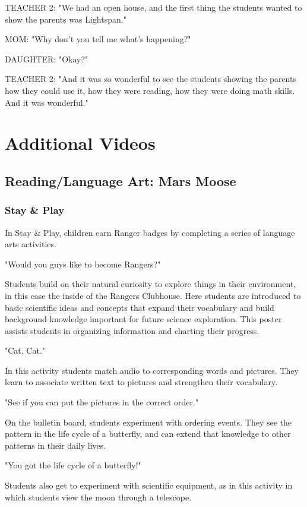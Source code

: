 TEACHER 2: "We had an open house, and the first thing the students wanted to show the parents was Lightspan."

MOM: "Why don't you tell me what's happening?"

DAUGHTER: "Okay?"

TEACHER 2: "And it was so wonderful to see the students showing the parents how they could use it, how they were reading, how they were doing math skills.
And it was wonderful."

\section{Additional Videos}

\subsection{Reading/Language Art: Mars Moose}

\subsubsection{Stay \& Play}

In Stay \& Play, children earn Ranger badges by completing a series of language arts activities.

"Would you guys like to become Rangers?"

Students build on their natural curiosity to explore things in their environment, in this case the inside of the Rangers Clubhouse.
Here students are introduced to basic scientific ideas and concepts that expand their vocabulary and build background knowledge important for future science exploration.
This poster assists students in organizing information and charting their progress.

"Cat. Cat."

In this activity students match audio to corresponding words and pictures.
They learn to associate written text to pictures and strengthen their vocabulary.

"See if you can put the pictures in the correct order."

On the bulletin board, students experiment with ordering events.
They see the pattern in the life cycle of a butterfly, and can extend that knowledge to other patterns in their daily lives.

"You got the life cycle of a butterfly!"

Students also get to experiment with scientific equipment, as in this activity in which students view the moon through a telescope.

